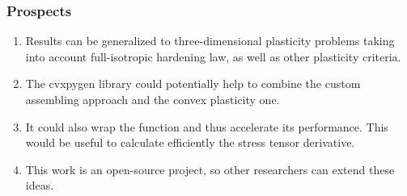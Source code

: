 \documentclass[9pt]{beamer}
\begin{document}
\begin{frame}[fragile]
  \frametitle{Prospects}

  \begin{enumerate}
    \item Results can be generalized to three-dimensional plasticity problems taking into account full-isotropic hardening law, as well as other plasticity criteria.
    \item The cvxpygen library could potentially help to combine the custom assembling approach and the convex plasticity one.
    \item It could also wrap the  function and thus accelerate its performance. This would be useful to calculate efficiently the stress tensor derivative.
    \item This work is an open-source project, so other researchers can extend these ideas. 
  \end{enumerate}
  

\end{frame}
\end{document}
